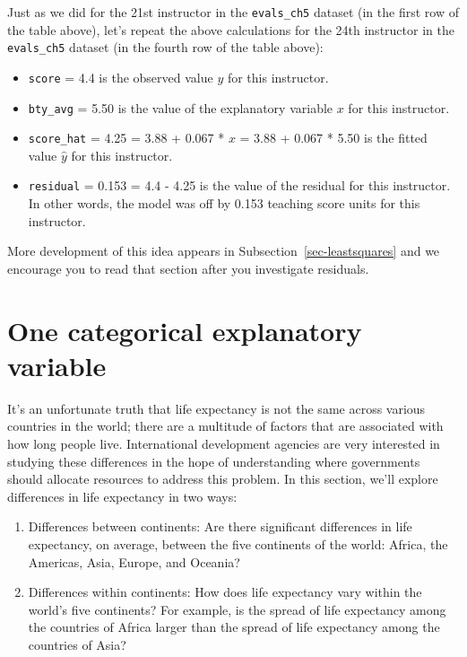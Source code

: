 \documentclass[
  letterpaper,
  DIV=11,
  numbers=noendperiod]{scrreprt}
\theoremstyle{definition}
\theoremstyle{remark}
\begin{document}
Just as we did for the 21st instructor in the \texttt{evals\_ch5}
dataset (in the first row of the table above), let's repeat the above
calculations for the 24th instructor in the \texttt{evals\_ch5} dataset
(in the fourth row of the table above):

\begin{itemize}
\item
  \texttt{score} = 4.4 is the observed value \(y\) for this instructor.
\item
  \texttt{bty\_avg} = 5.50 is the value of the explanatory variable
  \(x\) for this instructor.
\item
  \texttt{score\_hat} = 4.25 = 3.88 + 0.067 * \(x\) = 3.88 + 0.067 *
  5.50 is the fitted value \(\widehat{y}\) for this instructor.
\item
  \texttt{residual} = 0.153 = 4.4 - 4.25 is the value of the residual
  for this instructor. In other words, the model was off by 0.153
  teaching score units for this instructor.
\end{itemize}

More development of this idea appears in
Subsection~\ref{sec-leastsquares} and we encourage you to read that
section after you investigate residuals.

\hypertarget{sec-model2}{%
\section{One categorical explanatory variable}\label{sec-model2}}

It's an unfortunate truth that life expectancy is not the same across
various countries in the world; there are a multitude of factors that
are associated with how long people live. International development
agencies are very interested in studying these differences in the hope
of understanding where governments should allocate resources to address
this problem. In this section, we'll explore differences in life
expectancy in two ways:

\begin{enumerate}
\def\labelenumi{\arabic{enumi}.}
\item
  Differences between continents: Are there significant differences in
  life expectancy, on average, between the five continents of the world:
  Africa, the Americas, Asia, Europe, and Oceania?
\item
  Differences within continents: How does life expectancy vary within
  the world's five continents? For example, is the spread of life
  expectancy among the countries of Africa larger than the spread of
  life expectancy among the countries of Asia?
\end{enumerate}
\end{document}
